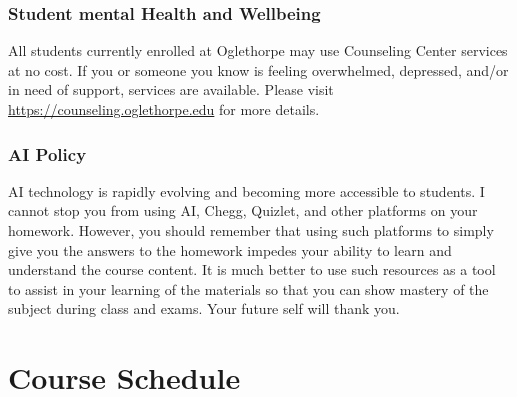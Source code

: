 \documentclass[
]{book}
\begin{document}
\subsection*{Student mental Health and Wellbeing}\label{student-mental-health-and-wellbeing}

All students currently enrolled at Oglethorpe may use Counseling Center services at no cost. If you or someone you know is feeling overwhelmed, depressed, and/or in need of support, services are available. Please visit \url{https://counseling.oglethorpe.edu} for more details.

\subsection*{AI Policy}\label{ai-policy}

AI technology is rapidly evolving and becoming more accessible to students. I cannot stop you from using AI, Chegg, Quizlet, and other platforms on your homework. However, you should remember that using such platforms to simply give you the answers to the homework impedes your ability to learn and understand the course content. It is much better to use such resources as a tool to assist in your learning of the materials so that you can show mastery of the subject during class and exams. Your future self will thank you.

\chapter*{Course Schedule}\label{course-schedule}
\end{document}
